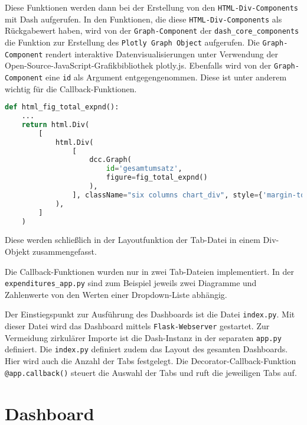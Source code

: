     Diese Funktionen werden dann bei der Erstellung von den \texttt{HTML-Div-Components} mit Dash aufgerufen. In den Funktionen,
    die diese \texttt{HTML-Div-Components} als Rückgabewert haben, wird von der \texttt{Graph-Component} der \texttt{dash\_core\_components}
    die Funktion zur Erstellung des \texttt{Plotly Graph Object} aufgerufen. Die \texttt{Graph-Component} rendert interaktive Datenvisualisierungen unter Verwendung der Open-Source-JavaScript-Grafikbibliothek plotly.js.
    Ebenfalls wird von der \texttt{Graph-Component} eine 
    \texttt{id} als Argument entgegengenommen. Diese ist unter anderem wichtig für die Callback-Funktionen. 
    

    \begin{lstlisting}[language=Python, caption={html\_fig\_total\_expnd()}] 
    def html_fig_total_expnd():
    ...
    return html.Div(
        [
            html.Div(
                [
                    dcc.Graph(
                        id='gesamtumsatz',
                        figure=fig_total_expnd()
                    ),
                ], className="six columns chart_div", style={'margin-top': '20px', 'margin-left': '10px'}
            ),
        ]
    )
    \end{lstlisting}

    Diese werden schließlich in der Layoutfunktion der Tab-Datei in einem Div-Objekt zusammengefasst.
    
    Die Callback-Funktionen wurden nur in zwei Tab-Dateien implementiert. 
    In der \texttt{expenditures\_app.py} sind zum Beispiel jeweils zwei Diagramme und Zahlenwerte von den Werten 
    einer Dropdown-Liste abhängig. 

    Der Einstiegspunkt zur Ausführung des Dashboards ist die Datei \texttt{index.py}. Mit dieser Datei wird das Dashboard mittels \texttt{Flask-Webserver}
    gestartet. Zur Vermeidung zirkulärer Importe ist die Dash-Instanz in der separaten \texttt{app.py} definiert\cite[vgl.][]{plotly_url_2021}.
    Die \texttt{index.py} definiert zudem das Layout des gesamten Dashboards. Hier wird auch die Anzahl der Tabs festgelegt. Die
    Decorator-Callback-Funktion \texttt{@app.callback()} steuert die Auswahl der Tabs und ruft die jeweiligen Tabs auf.




\section{Dashboard}


